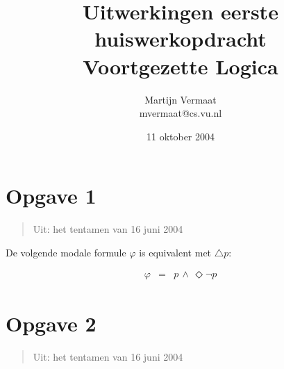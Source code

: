 \documentclass[a4paper,11pt]{article}
\title{Uitwerkingen eerste huiswerkopdracht\\Voortgezette Logica}
\author{
    Martijn Vermaat\\
    mvermaat@cs.vu.nl
}
\date{11 oktober 2004}
\begin{document}
\maketitle


\section*{Opgave 1}

\begin{quote}
Uit: het tentamen van 16 juni 2004
\end{quote}

De volgende modale formule $\varphi$ is equivalent met $\triangle p$:

\begin{eqnarray*}
\varphi & = & p \, \land \, \Diamond \lnot p
\end{eqnarray*}


\section*{Opgave 2}

\begin{quote}
Uit: het tentamen van 16 juni 2004
\end{quote}
\end{document}
